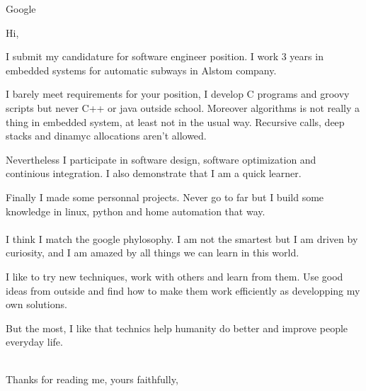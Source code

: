 \documentclass[11pt]{lettre}
\makeatletter
\newcommand*{\NoRule}{\renewcommand*{\rule@length}{0}}
\makeatother
\begin{document}
\begin{letter}{Google}

  \def\concname{Objet :~}

  \date{October 4th, 2016}
  \signature{Hoel IRIS}
  \address{Hoel IRIS\\
  54 avenue Mathurin Moreau\\
  75019 Paris\\
  Tel : 06 18 39 30 11\\
  E-Mail : hoel.iris@gmail.com}
  \NoRule
  \notelephone
  \nofax
    \opening{Hi,\newline{}}
    
      I submit my candidature for software engineer position. 
      I work 3 years in embedded systems for automatic subways in Alstom company.
      
      I barely meet requirements for your position, I develop C programs and groovy scripts but never C++ or java outside school. 
      Moreover algorithms is not really a thing in embedded system, at least not in the usual way. Recursive calls, deep stacks and dinamyc allocations aren't allowed. 
      
      Nevertheless I participate in software design, software optimization and continious integration.  
      I also demonstrate that I am a quick learner.
      
      Finally I made some personnal projects. Never go to far but I build some knowledge in linux, python and home automation that way.\\\\
         
      I think I match the google phylosophy. I am not the smartest but I am driven by curiosity, and I am amazed by all things we can learn in this world.
      
      I like to try new techniques, work with others and learn from them. Use good ideas from outside and find how to make them work efficiently as developping my own solutions.
      
      But the most, I like that technics help humanity do better and improve people everyday life.\\\\
          
    \closing{Thanks for reading me, yours faithfully,}
    
 
\end{letter}
 
\end{document}
